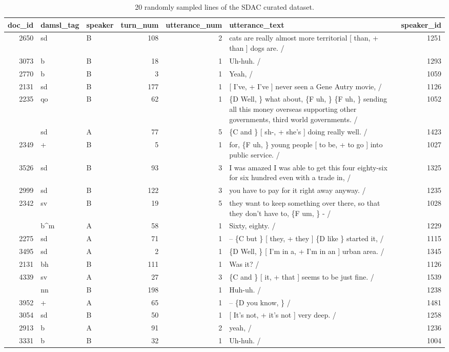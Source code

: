 \documentclass[
]{article}
\begin{document}
\begin{table}

\caption{\label{tab:td-sdac-preview-curated-dataset}20 randomly sampled lines of the SDAC curated dataset.}
\centering
\begin{tabular}[t]{rllrrlr}
\toprule
doc\_id & damsl\_tag & speaker & turn\_num & utterance\_num & utterance\_text & speaker\_id\\
\midrule
2650 & sd & B & 108 & 2 & cats are really almost more territorial [ than, + than ]  dogs  are.  / & 1251\\
3073 & b & B & 18 & 1 & Uh-huh. / & 1293\\
2770 & b & B & 3 & 1 & Yeah, / & 1059\\
2131 & sd & B & 177 & 1 & {}[ I've, + I've  ] never seen a Gene Autry movie, / & 1126\\
2235 & qo & B & 62 & 1 & \{D Well, \} what about, \{F uh, \} \{F uh, \} sending  all this money overseas supporting other governments, third world governments.  / & 1052\\
\addlinespace
4799 & sd & A & 77 & 5 & \{C and \} [ sh-, + she's ] doing really well.  / & 1423\\
2349 & + & B & 5 & 1 & for, \{F uh, \} young people  [ to be, + to go ] into public service.  / & 1027\\
3526 & sd & B & 93 & 3 & I was amazed I was able to get this four eighty-six for six hundred even with a trade in,  / & 1325\\
2999 & sd & B & 122 & 3 & you have to pay for it right away anyway. / & 1235\\
2342 & sv & B & 19 & 5 & they want to keep something over there, so that they don't have to, \{F um, \} - / & 1028\\
\addlinespace
3051 & b\textasciicircum{}m & A & 58 & 1 & Sixty, eighty. / & 1229\\
2275 & sd & A & 71 & 1 & -- \{C but \} [ they, + they ] \{D like \} started it,  / & 1115\\
3495 & sd & A & 2 & 1 & \{D Well, \} [ I'm in a, +  I'm in an ]  urban area.  / & 1345\\
2131 & bh & B & 111 & 1 & Was it? / & 1126\\
4339 & sv & A & 27 & 3 & \{C and \} [ it, + that ] seems to be just fine.  / & 1539\\
\addlinespace
2830 & nn & B & 198 & 1 & Huh-uh. / & 1238\\
3952 & + & A & 65 & 1 & -- \{D you know, \}  / & 1481\\
3054 & sd & B & 50 & 1 & {}[ It's not, + it's not  ] very deep. / & 1258\\
2913 & b & A & 91 & 2 & yeah,  / & 1236\\
3331 & b & B & 32 & 1 & Uh-huh. / & 1004\\
\bottomrule
\end{tabular}
\end{table}
\end{document}
